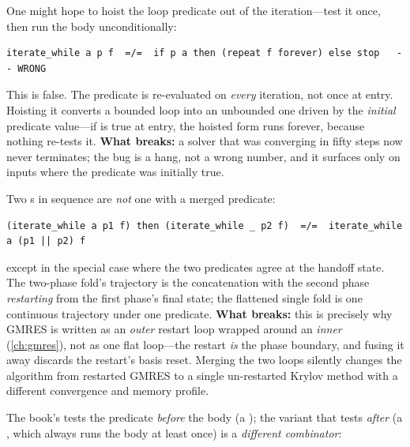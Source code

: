 \begin{description}[style=nextline, leftmargin=0pt, font=\normalfont\itshape]
  \item[Predicate hoisting is invalid.] One might hope to hoist the loop predicate
  out of the iteration---test it once, then run the body unconditionally:
  \begin{lstlisting}[style=l4style]
iterate_while a p f  =/=  if p a then (repeat f forever) else stop   -- WRONG
  \end{lstlisting}
  This is false. The predicate is re-evaluated on \emph{every} iteration, not once at
  entry. Hoisting it converts a bounded loop into an unbounded one driven by the
  \emph{initial} predicate value---if  is true at entry, the hoisted form
  runs forever, because nothing re-tests it. \textbf{What breaks:} a solver that was
  converging in fifty steps now never terminates; the bug is a hang, not a wrong
  number, and it surfaces only on inputs where the predicate was initially true.
  \item[Loop fusion across iterations is invalid.] Two s in
  sequence are \emph{not} one  with a merged predicate:
  \begin{lstlisting}[style=l4style]
(iterate_while a p1 f) then (iterate_while _ p2 f)  =/=  iterate_while a (p1 || p2) f
  \end{lstlisting}
  except in the special case where the two predicates agree at the handoff state.
  The two-phase fold's trajectory is the concatenation  with the
  second phase \emph{restarting} from the first phase's final state; the flattened
  single fold is one continuous trajectory under one predicate. \textbf{What breaks:}
  this is precisely why GMRES is written as an \emph{outer} restart loop wrapped
  around an \emph{inner}  (\cref{ch:gmres}), not as one flat
  loop---the restart \emph{is} the phase boundary, and fusing it away discards the
  restart's basis reset. Merging the two loops silently changes the algorithm from
  restarted GMRES to a single un-restarted Krylov method with a different convergence
  and memory profile.
  \item[\code{while} and \code{do-while} are not interchangeable.] The book's
   tests the predicate \emph{before} the body (a );
  the variant that tests \emph{after} (a , which always runs the body
  at least once) is a \emph{different combinator}:
  \begin{lstlisting}[style=l4style]

\end{lstlisting}
\end{description}
